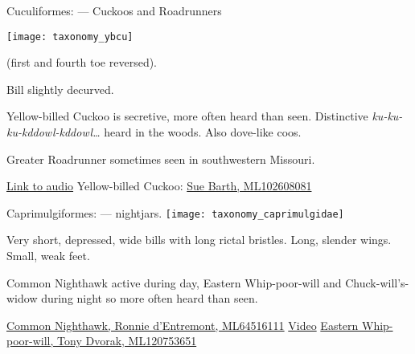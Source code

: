 \documentclass[t]{beamer}
\newcommand{\backoneline}{\vspace{-\baselineskip}}
\begin{document}
\begin{frame}{Cuculiformes:  — Cuckoos and Roadrunners}

\backoneline

\begin{multicols}{2}

\texttt{[image: taxonomy\_ybcu]}

\columnbreak

 (first and fourth toe reversed). 

\vspace{\baselineskip}

Bill slightly decurved.

\vspace{\baselineskip}

Yellow-billed Cuckoo is secretive, more often heard than seen. Distinctive \emph{ku-ku-ku-kddowl-kddowl\dots} heard in the woods. Also dove-like coos.

\vspace{\baselineskip}

Greater Roadrunner sometimes seen in southwestern Missouri.


\end{multicols}

\vfilll


\tiny \href{https://macaulaylibrary.org/asset/94446}{Link to audio} \hfill Yellow-billed Cuckoo: \href{https://macaulaylibrary.org/asset/102608081}{Sue Barth, ML102608081}


\end{frame}




\begin{frame}[t]{Caprimulgiformes:  — nightjars.}
\texttt{[image: taxonomy\_caprimulgidae]}

\hangpara Very short, depressed, wide bills with long rictal bristles. Long, slender wings. Small, weak feet.

\hangpara Common Nighthawk active during day, Eastern Whip-poor-will and Chuck-will's-widow during night so more often heard than seen.

\vfilll

\tiny \href{https://macaulaylibrary.org/asset/64516111}{Common Nighthawk, Ronnie d'Entremont, ML64516111} \hfill \href{https://www.allaboutbirds.org/guide/Common_Nighthawk/photo-gallery/466538}{Video} \hfill \href{https://macaulaylibrary.org/asset/120753651}{Eastern Whip-poor-will, Tony Dvorak, ML120753651}
\end{frame}
\end{document}
